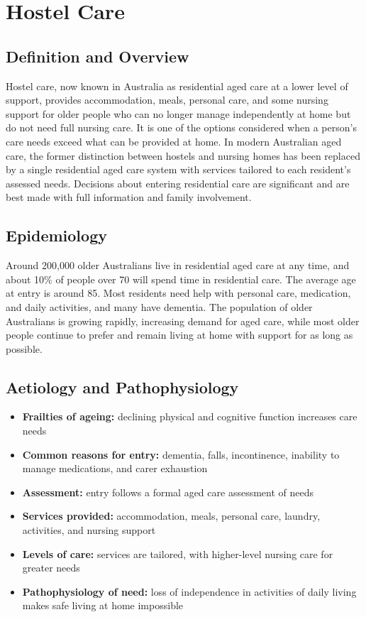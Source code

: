 \chapter{Hostel Care}

\section*{Definition and Overview}
Hostel care, now known in Australia as residential aged care at a lower level of support, provides accommodation, meals, personal care, and some nursing support for older people who can no longer manage independently at home but do not need full nursing care. It is one of the options considered when a person's care needs exceed what can be provided at home. In modern Australian aged care, the former distinction between hostels and nursing homes has been replaced by a single residential aged care system with services tailored to each resident's assessed needs. Decisions about entering residential care are significant and are best made with full information and family involvement.

\section*{Epidemiology}
Around 200,000 older Australians live in residential aged care at any time, and about 10\% of people over 70 will spend time in residential care. The average age at entry is around 85. Most residents need help with personal care, medication, and daily activities, and many have dementia. The population of older Australians is growing rapidly, increasing demand for aged care, while most older people continue to prefer and remain living at home with support for as long as possible.

\section*{Aetiology and Pathophysiology}
\begin{itemize}
    \item \textbf{Frailties of ageing:} declining physical and cognitive function increases care needs
    \item \textbf{Common reasons for entry:} dementia, falls, incontinence, inability to manage medications, and carer exhaustion
    \item \textbf{Assessment:} entry follows a formal aged care assessment of needs
    \item \textbf{Services provided:} accommodation, meals, personal care, laundry, activities, and nursing support
    \item \textbf{Levels of care:} services are tailored, with higher-level nursing care for greater needs
    \item \textbf{Pathophysiology of need:} loss of independence in activities of daily living makes safe living at home impossible
\end{itemize}

